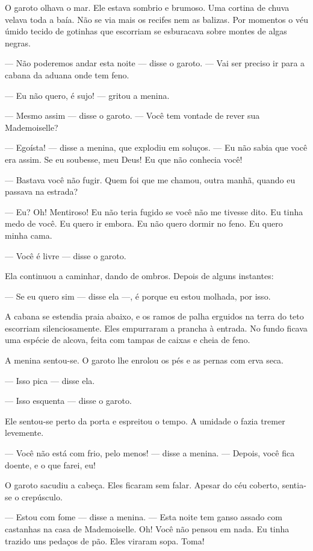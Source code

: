 O garoto olhava o mar. Ele estava sombrio e brumoso. Uma cortina de
chuva velava toda a baía. Não se via mais os recifes nem as balizas. Por
momentos o véu úmido tecido de gotinhas que escorriam se esburacava
sobre montes de algas negras.

--- Não poderemos andar esta noite --- disse o garoto. --- Vai ser preciso ir
para a cabana da aduana onde tem feno.

--- Eu não quero, é sujo! --- gritou a menina.

--- Mesmo assim --- disse o garoto. --- Você tem vontade de rever sua
Mademoiselle?

--- Egoísta! --- disse a menina, que explodiu em soluços. --- Eu não sabia que
você era assim. Se eu soubesse, meu Deus! Eu que não conhecia você!

--- Bastava você não fugir. Quem foi que me chamou, outra manhã, quando
eu passava na estrada?

--- Eu? Oh! Mentiroso! Eu não teria fugido se você não me tivesse dito.
Eu tinha medo de você. Eu quero ir embora. Eu não quero dormir no feno. Eu
quero minha cama.

--- Você é livre --- disse o garoto.

Ela continuou a caminhar, dando de ombros. Depois de alguns instantes:

--- Se eu quero sim --- disse ela ---, é porque eu estou molhada, por isso.

A cabana se estendia praia abaixo, e os ramos de palha erguidos na
terra do teto escorriam silenciosamente. Eles empurraram a prancha à
entrada. No fundo ficava uma espécie de alcova, feita com tampas de caixas
e cheia de feno.

A menina sentou-se. O garoto lhe enrolou os pés e as pernas com erva
seca.

--- Isso pica --- disse ela.

--- Isso esquenta --- disse o garoto.

Ele sentou-se perto da porta e espreitou o tempo. A umidade o fazia
tremer levemente.

--- Você não está com frio, pelo menos! --- disse a menina. --- Depois, você fica
doente, e o que farei, eu!

O garoto sacudiu a cabeça. Eles ficaram sem falar. Apesar do céu
coberto, sentia-se o crepúsculo.

--- Estou com fome --- disse a menina. --- Esta noite tem ganso assado com
castanhas na casa de Mademoiselle. Oh! Você não pensou em nada. Eu tinha
trazido uns pedaços de pão. Eles viraram sopa. Toma!

